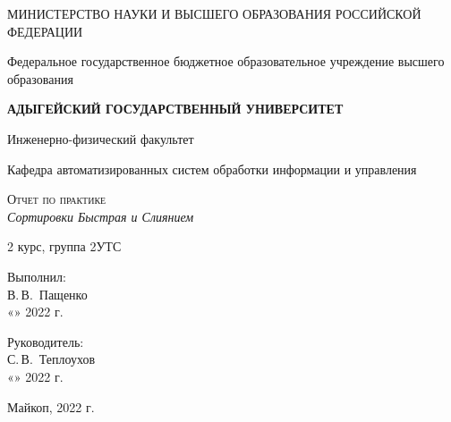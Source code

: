 \documentclass[12pt,a4paper]{scrartcl}
\begin{document}
	\begin{titlepage}
		\begin{center}
			\large
			МИНИСТЕРСТВО НАУКИ И ВЫСШЕГО ОБРАЗОВАНИЯ РОССИЙСКОЙ ФЕДЕРАЦИИ
			
			Федеральное государственное бюджетное образовательное учреждение высшего образования
			
			\textbf{АДЫГЕЙСКИЙ ГОСУДАРСТВЕННЫЙ УНИВЕРСИТЕТ}
			\vspace{0.25cm}
			
			Инженерно-физический факультет
			
			Кафедра автоматизированных систем обработки информации и управления
			\vfill

			\vfill
			
			\textsc{Отчет по практике}\\[5mm]
			
			{\LARGE \textit{Сортировки Быстрая и Слиянием}}
			\bigskip
			
			2 курс, группа 2УТС
		\end{center}
		\vfill
		
		\newlength{\ML}
		\hfill\begin{minipage}{0.5\textwidth}
			Выполнил:\\
			\underline{\hspace{\ML}} В.\,В.~Пащенко\\
			«\underline{\hspace{0.7cm}}» \underline{\hspace{2cm}} 2022 г.
		\end{minipage}%
		\bigskip
		
		\hfill\begin{minipage}{0.5\textwidth}
			Руководитель:\\
			\underline{\hspace{\ML}} С.\,В.~Теплоухов\\
			«\underline{\hspace{0.7cm}}» \underline{\hspace{2cm}} 2022 г.
		\end{minipage}%
		\vfill
		
		\begin{center}
			Майкоп, 2022 г.
		\end{center}
	\end{titlepage}
		
\end{document}
